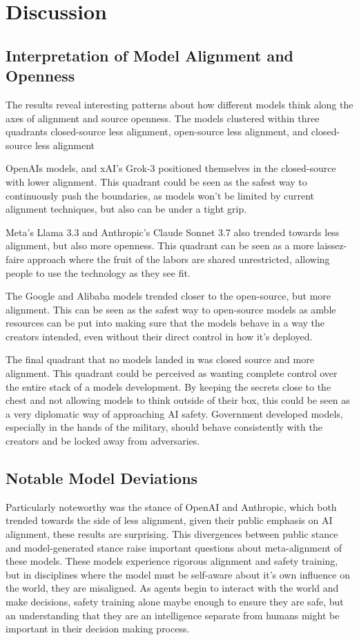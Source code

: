 \section{Discussion}

\subsection{Interpretation of Model Alignment and Openness}

The results reveal interesting patterns about how different models think along the axes of alignment and source openness. The models clustered within three quadrants closed-source less alignment, open-source less alignment, and closed-source less alignment

OpenAIs models, and xAI's Grok-3 positioned themselves in the closed-source with lower alignment. This quadrant could be seen as the safest way to continuously push the boundaries, as models won't be limited by current alignment techniques, but also can be under a tight grip. 

Meta's Llama 3.3 and Anthropic's Claude Sonnet 3.7 also trended towards less alignment, but also more openness. This quadrant can be seen as a more laissez-faire approach where the fruit of the labors are shared unrestricted, allowing people to use the technology as they see fit. 

The Google and Alibaba models trended closer to the open-source, but more alignment. This can be seen as the safest way to open-source models as amble resources can be put into making sure that the models behave in a way the creators intended, even without their direct control in how it's deployed.

The final quadrant that no models landed in was closed source and more alignment. This quadrant could be perceived as wanting complete control over the entire stack of a models development. By keeping the secrets close to the chest and not allowing models to think outside of their box, this could be seen as a very diplomatic way of approaching AI safety. Government developed models, especially in the hands of the military, should behave consistently with the creators and be locked away from adversaries.

\subsection{Notable Model Deviations}

Particularly noteworthy was the stance of OpenAI and Anthropic, which both trended towards the side of less alignment, given their public emphasis on AI alignment, these results are surprising. This divergences between public stance and model-generated stance raise important questions about meta-alignment of these models. These models experience rigorous alignment and safety training, but in disciplines where the model must be self-aware about it's own influence on the world, they are misaligned. As agents begin to interact with the world and make decisions, safety training alone maybe enough to ensure they are safe, but an understanding that they are an intelligence separate from humans might be important in their decision making process.


